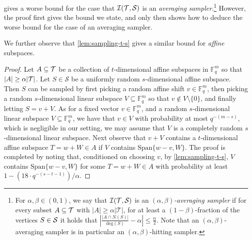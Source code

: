 \documentclass{toc}
\theoremstyle{plain}
\newcommand{\F}{{\mathbb{F}}}
\newcommand{\calT}{{\mathcal{T}}}
\newcommand{\calS}{{\mathcal{S}}}
\newcommand{\calI}{{\mathcal{I}}}
\begin{document}

\begin{remark}
\cite[Lemma 2.3]{ImpagliazzoKW2012} gives a 
%
%
%
worse bound for the case that $\calI(\cal T, \cal S)$ is an 
\emph{averaging sampler}.\footnote{ For $\alpha, \beta \in (0,1)$, we say that $\calI (\cal T, \cal S)$ is 
 an \emph{$(\alpha, \beta)$-averaging sampler} if for every subset $A \subseteq \cal T$ with $|A| \geq \alpha |\calT|$, 
for at least a $(1-\beta)$-fraction of the vertices $S \in \cal S$ it holds that $\left|\frac{|A \cap  N(S)|} {\mathrm{deg}(S)} - \alpha \right| \leq \frac \alpha 2$. Note that an $(\alpha, \beta)$-averaging sampler is in particular an $(\alpha, \beta)$-hitting sampler.} However, the proof first gives the bound we state, and only then shows how to deduce the worse bound for the case of an averaging sampler.
\end{remark}

We further observe that \cref{lem:sampling-t-s} gives a similar bound for \emph{affine} subspaces.


\begin{proof}
  Let $A \subseteq \cal T$ be a collection of $t$-dimensional affine subspaces in $\F_q^m$ so that $|A| \geq \alpha |\cal T|$. Let $S \in \calS$ be a uniformly random $s$-dimensional affine subspace. Then $S$ can be sampled by first picking a random affine shift $v \in \F_q^m$, then picking a random $s$-dimensional linear subspace $V \subseteq \F_q^m$ so that $v \notin V \setminus \{0\}$, and finally letting $S = v+V$. As for a fixed vector $v \in \F_q^m$, and a random $s$-dimensional linear subspace $V \subseteq \F_q^m$, we have that $v \in V$ with probability at most $q^{-(m-s)}$, which is negligible in our setting, we may assume that $V$ is a completely random $s$-dimensional linear subspace. Next observe that $v +V$ contains a $t$-dimensional affine subspace $T = w+W \in A$ if $V$ contains $\mathrm{Span}\{w-v,W\}$. The proof is completed by noting that, conditioned on choosing $v$, by \cref{lem:sampling-t-s}, $V$ contains $\mathrm{Span}\{w-v,W\}$ for some $T = w+W \in A$ with probability at least
%
$1 - \left(18 \cdot q^{-(s-t-1)}\right)/\alpha$.  %
\end{proof}
\end{document}
